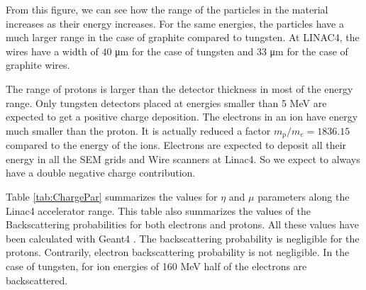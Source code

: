 From this figure, we can see how the range of the particles in the material increases as their energy increases. For the same energies, the particles have a much larger range in the case of graphite compared to tungsten. At LINAC4, the wires have a width of $40$ \si{\micro\metre} for the case of tungsten and 33 \si{\micro \metre} for the case of graphite wires. 

The range of protons is larger than the detector thickness in most of the energy range. Only tungsten detectors placed at energies smaller than 5  \si[]{\mega\electronvolt} are expected to get a positive charge deposition. The electrons in an \hm ion have energy much smaller than the proton. It is actually reduced a factor $m_p / m_e = 1836.15$ compared to the energy of the \hm ions.  Electrons are expected to deposit all their energy in all the SEM grids and Wire scanners at Linac4. So we expect to always have a double negative charge contribution. 

Table \ref{tab:ChargePar} summarizes the values for $\eta$ and $\mu$ parameters along the Linac4 accelerator range. This table also summarizes the values of the Backscattering probabilities for both electrons and protons. All these values have been calculated with Geant4 \parencite[][]{ref:Geant4}. The backscattering probability is negligible for the protons. Contrarily, electron backscattering probability is not negligible. In the case of tungsten, for ion energies of 160 MeV half of the electrons are backscattered.

